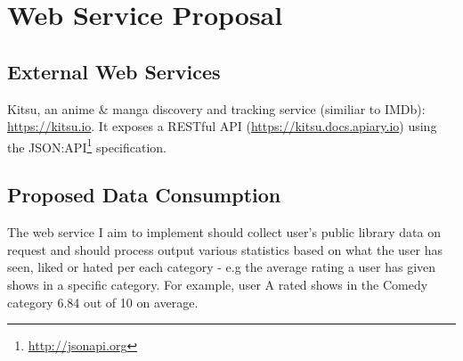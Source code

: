 \section{Web Service Proposal}
\subsection{External Web Services}

Kitsu, an anime \& manga discovery and tracking service (similiar to IMDb): \url{https://kitsu.io}. It exposes a RESTful API (\url{https://kitsu.docs.apiary.io}) using the JSON:API\footnote{\url{http://jsonapi.org}} specification.

\subsection{Proposed Data Consumption}

The web service I aim to implement should collect user's public library data on request and should process output various statistics based on what the user has seen, liked or hated per each category - e.g the average rating a user has given shows in a specific category. For example, user A rated shows in the Comedy category 6.84 out of 10 on average.
